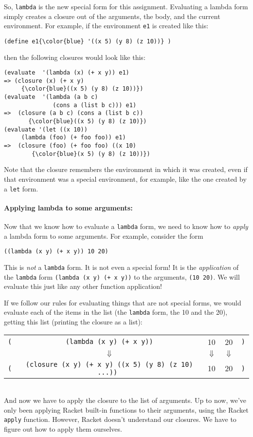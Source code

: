 \documentclass[letterpaper,12pt]{article}
\begin{document}
  So, \texttt{lambda} is the new special form for this assignment.  Evaluating a
  lambda form simply creates a closure out of the arguments, the body, and the
  current environment.  For example, if the environment \texttt{e1} is created
  like this:
\begin{Verbatim}[commandchars=\\\{\}]
(define e1{\color{blue} '((x 5) (y 8) (z 10))} )
\end{Verbatim}
  then the following closures would look like this:
\begin{Verbatim}[frame=single,commandchars=\\\{\}]
(evaluate  '(lambda (x) (+ x y)) e1)
=> (closure (x) (+ x y) 
     {\color{blue}((x 5) (y 8) (z 10))})
(evaluate  '(lambda (a b c) 
              (cons a (list b c))) e1)
=>  (closure (a b c) (cons a (list b c)) 
       {\color{blue}((x 5) (y 8) (z 10)})
(evaluate '(let ((x 10)) 
     (lambda (foo) (+ foo foo)) e1)
=>  (closure (foo) (+ foo foo) ((x 10) 
        {\color{blue}(x 5) (y 8) (z 10))})
\end{Verbatim}
  Note that the closure remembers the environment in which it was created, even
  if that environment was a special environment, for example, like the one
  created by a \texttt{let} form.

  \paragraph{Applying lambda to some arguments:}
  Now that we know how to evaluate a \texttt{lambda} form, we need to know how
  to {\em apply} a lambda form to some arguments.  For example, consider the
  form
\begin{Verbatim}[frame=single]
((lambda (x y) (+ x y)) 10 20)
\end{Verbatim}
  This is {\em not} a \texttt{lambda} form.  It is not even a special form!  It
  is the {\em application} of the \texttt{lambda} form \texttt{(lambda (x y) (+
    x y))} to the arguments, \texttt{(10 20)}.  We will evaluate this just like
  any other function application!

  If we follow our rules for evaluating things that are not special forms, we
  would evaluate each of the items in the list (the \texttt{lambda} form, the 10
  and the 20), getting this list
  (printing the closure as a list):\\
  \begin{tabular}{|rcccl|}\hline
    \texttt{(}&\texttt{(lambda (x y) (+ x y))} & 10 & 20 & \texttt{)}\\
              &  \ensuremath{\Downarrow} & \ensuremath{\Downarrow} & \ensuremath{\Downarrow} &\\
    \texttt{(} & \texttt{(closure (x y) (+ x y) {\color{blue}((x 5) (y 8) (z
                 10) ...)}) } & 10 &  20& \texttt{)}\\\hline
  \end{tabular}\\
  And now we have to apply the closure to the list of arguments.  Up to
  now, we've only been applying Racket built-in functions to their
  arguments, using the Racket \texttt{apply} function.  However, Racket
  doesn't understand our closures.  We have to figure out how to apply
  them ourselves.
\end{document}
